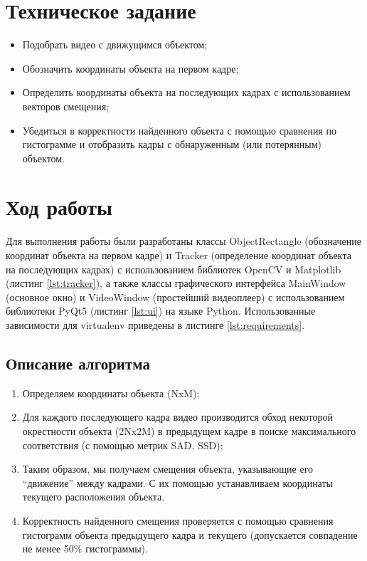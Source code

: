 \section{Техническое задание}

\begin{itemize}
	\item Подобрать видео с движущимся объектом;
	\item Обозначить координаты объекта на первом кадре;
	\item Определить координаты объекта на последующих кадрах с использованием векторов смещения;
	\item Убедиться в корректности найденного объекта с помощью сравнения по гистограмме и отобразить кадры с обнаруженным (или потерянным) объектом.
\end{itemize}

\section{Ход работы}

Для выполнения работы были разработаны классы ObjectRectangle (обозначение координат объекта на первом кадре) и Tracker (определение координат объекта на последующих кадрах) с использованием библиотек OpenCV и Matplotlib (листинг \vref{lst:tracker}), а также классы графического интерфейса MainWindow (основное окно) и VideoWindow (простейший видеоплеер) с использованием библиотеки PyQt5 (листинг \cref{lst:ui}) на языке Python. Использованные зависимости для virtualenv приведены в листинге \cref{lst:requirements}.

\subsection{Описание алгоритма}

\begin{enumerate}
	\item Определяем координаты объекта (NxM);
	\item Для каждого последующего кадра видео производится обход некоторой окрестности объекта (2Nx2M) в предыдущем кадре в поиске максимального соответствия (с помощью метрик SAD, SSD);
	\item Таким образом, мы получаем смещения объекта, указывающие его "`движение"' между кадрами. С их помощью устанавливаем координаты текущего расположения объекта.
	\item Корректность найденного смещения проверяется с помощью сравнения гистограмм объекта предыдущего кадра и текущего (допускается совпадение не менее 50\% гистограммы).
\end{enumerate}

